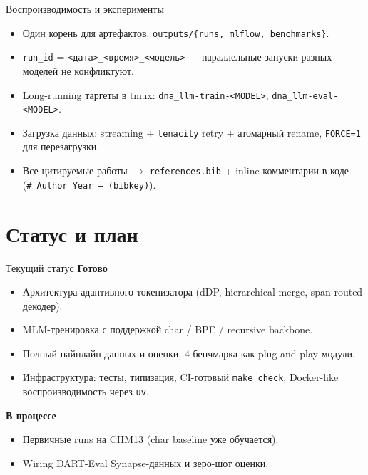 \documentclass[aspectratio=169,xcolor=table]{beamer}
\begin{document}
\begin{frame}{Воспроизводимость и эксперименты}
  \begin{itemize}
    \item Один корень для артефактов: \texttt{outputs/\{runs, mlflow, benchmarks\}}.
    \item \texttt{run\_id} = \texttt{<дата>\_<время>\_<модель>} ---
          параллельные запуски разных моделей не конфликтуют.
    \item Long-running таргеты в tmux:
          \texttt{dna\_llm-train-<MODEL>}, \texttt{dna\_llm-eval-<MODEL>}.
    \item Загрузка данных: streaming + \texttt{tenacity} retry +
          атомарный rename, \texttt{FORCE=1} для перезагрузки.
    \item Все цитируемые работы $\to$ \texttt{references.bib} +
          inline-комментарии в коде (\texttt{\#~Author Year --
          (bibkey)}).
  \end{itemize}
\end{frame}

\section{Статус и план}

\begin{frame}{Текущий статус}
  \textbf{Готово}
  \begin{itemize}
    \item Архитектура адаптивного токенизатора (dDP, hierarchical merge,
          span-routed декодер).
    \item MLM-тренировка с поддержкой char / BPE / recursive backbone.
    \item Полный пайплайн данных и оценки, 4 бенчмарка как
          plug-and-play модули.
    \item Инфраструктура: тесты, типизация, CI-готовый \texttt{make check},
          Docker-like воспроизводимость через \texttt{uv}.
  \end{itemize}
  \medskip
  \textbf{В процессе}
  \begin{itemize}
    \item Первичные runs на CHM13 (char baseline уже обучается).
    \item Wiring DART-Eval Synapse-данных и зеро-шот оценки.
  \end{itemize}
\end{frame}
\end{document}
